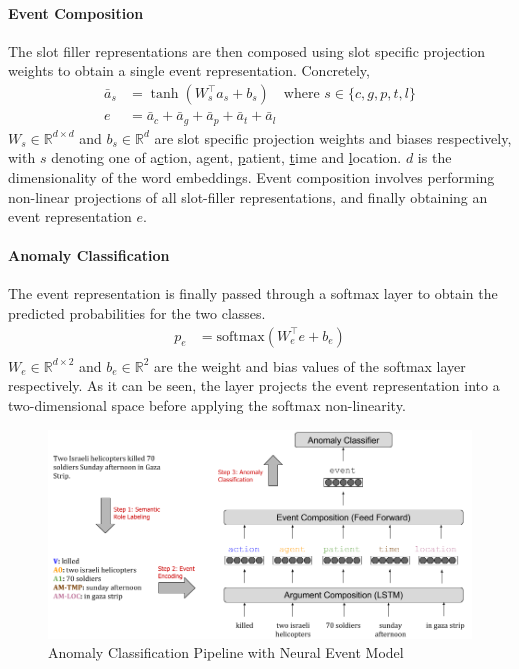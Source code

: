 \paragraph{Event Composition} The slot filler representations are then composed using slot specific
projection weights to obtain a single event representation. Concretely,
\begin{align}
 \bar{a}_s &= \tanh(W_s^\intercal a_s + b_s) \quad \text{where } s \in \{c,g,p,t,l\} \\
 e &=  \bar{a}_c + \bar{a}_g + \bar{a}_p + \bar{a}_t + \bar{a}_l 
\end{align}
$W_s \in \mathbb{R}^{d \times d}$ and $b_s \in \mathbb{R}^{d}$ are slot specific projection weights and biases respectively, with $s$ denoting one of a\underline{c}tion,
a\underline{g}ent, \underline{p}atient, \underline{t}ime and \underline{l}ocation. $d$ is the dimensionality of the word embeddings.
Event composition involves performing non-linear projections of all slot-filler representations, and finally obtaining an event representation
$e$.

\paragraph{Anomaly Classification} The event representation is finally passed through a softmax layer to obtain
the predicted probabilities for the two classes.
\begin{align}
 p_e & = \text{softmax}(W_e^\intercal e + b_e) \\
\end{align}
$W_e \in \mathbb{R}^{d \times 2}$ and $b_e \in \mathbb{R}^2$ are the weight and bias values of the softmax layer respectively.
As it can be seen, the layer projects the event representation into a two-dimensional space before applying the softmax non-linearity.

\begin{figure}
  \begin{center}
  \includegraphics[width=6.5in]{figures/nem_pipeline.png}
  \caption{Anomaly Classification Pipeline with Neural Event Model}\label{fig:nem}
  \end{center}
\end{figure}

